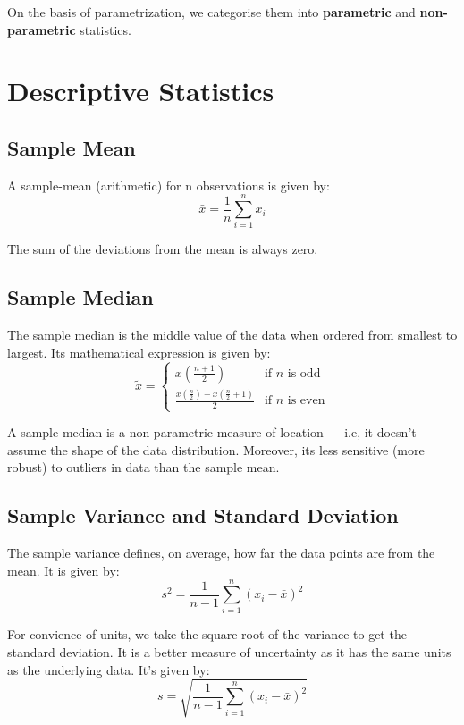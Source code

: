 \documentclass[letterpaper,12pt]{article}
\begin{document}
On the basis of parametrization, we categorise them into \textbf{para\-metric} and \textbf{non-para\-metric} statistics.

\section{Descriptive Statistics}
\subsection{Sample Mean}
A sample-mean (arithmetic) for n observations is given by:
\begin{equation}
	\bar{x} = \frac{1}{n} \sum_{i=1}^{n} x_i
\end{equation}

The sum of the deviations from the mean is always zero.


\subsection{Sample Median}
The sample median is the middle value of the data when ordered from smallest to largest. Its mathematical expression is given by:
\begin{equation}
	\tilde{x} = \left\{
	\begin{array}{ll}
		x{(\frac{n+1}{2})} & \text{if } n \text{ is odd} \\
		\frac{x{\left(\frac{n}{2}\right)} + x{\left(\frac{n}{2} + 1\right)}}{2} & \text{if } n \text{ is even}
	\end{array}
	\right.
\end{equation}

A sample median is a non-parametric measure of location --- i.e, it doesn't assume the shape of the data distribution. Moreover, its less sensitive (more robust) to outliers in data than the sample mean. 

\subsection{Sample Variance and Standard Deviation}
The sample variance defines, on average, how far the data points are from the mean. It is given by:
\begin{equation}
	s^2 = \frac{1}{n-1} \sum_{i=1}^{n} {\left(x_i - \bar{x}\right)}^2
\end{equation}

For convience of units, we take the square root of the variance to get the standard deviation. It is a better measure of uncertainty as it has the same units as the underlying data. It's given by:
\begin{equation}
	s = \sqrt{\frac{1}{n-1} \sum_{i=1}^{n} {\left(x_i - \bar{x}\right)}^2}
\end{equation}
\end{document}
